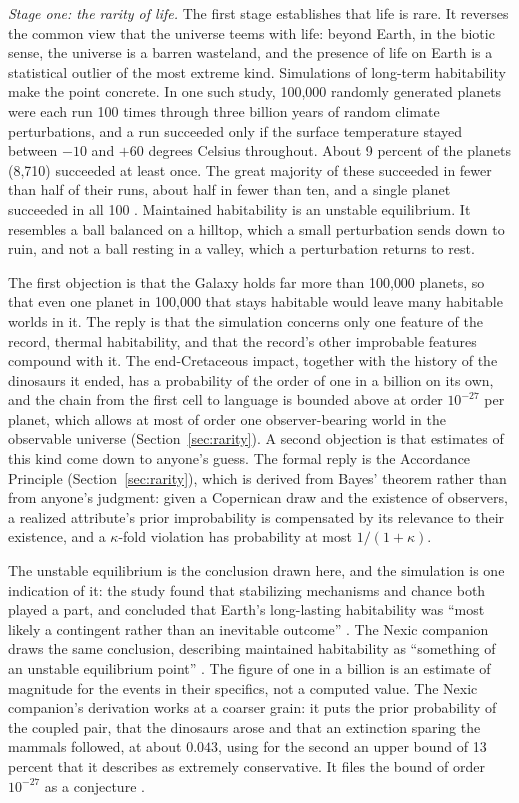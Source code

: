 \emph{Stage one: the rarity of life.} The first stage establishes that life
is rare. It reverses the common view that the universe teems with life:
beyond Earth, in the biotic sense, the universe is a barren wasteland, and
the presence of life on Earth is a statistical outlier of the most extreme
kind. Simulations of long-term habitability make the point concrete. In one
such study, 100{,}000 randomly generated planets were each run 100 times
through three billion years of random climate perturbations, and a run
succeeded only if the surface temperature stayed between $-10$ and $+60$
degrees Celsius throughout. About 9 percent of the planets (8{,}710)
succeeded at least once. The great majority of these succeeded in fewer than
half of their runs, about half in fewer than ten, and a single planet
succeeded in all 100 \cite{Tyrrell2020}. Maintained habitability is an
unstable equilibrium. It resembles a ball balanced on a hilltop, which a
small perturbation sends down to ruin, and not a ball resting in a valley,
which a perturbation returns to rest.

The first objection is that the Galaxy holds far more than 100{,}000
planets, so that even one planet in 100{,}000 that stays habitable would
leave many habitable worlds in it. The reply is that the simulation concerns
only one feature of the record, thermal habitability, and that the record's
other improbable features compound with it. The end-Cretaceous impact,
together with the history of the dinosaurs it ended, has a probability of
the order of one in a billion on its own, and the chain from the first cell
to language is bounded above at order $10^{-27}$ per planet, which allows at
most of order one observer-bearing world in the observable universe
(Section~\ref{sec:rarity}). A second objection is that estimates of this
kind come down to anyone's guess. The formal reply is the Accordance
Principle (Section~\ref{sec:rarity}), which is derived from Bayes' theorem
rather than from anyone's judgment: given a Copernican draw and the
existence of observers, a realized attribute's prior improbability is
compensated by its relevance to their existence, and a $\kappa$-fold
violation has probability at most $1/(1+\kappa)$.

The unstable equilibrium is the conclusion drawn here, and the simulation is
one indication of it: the study found that stabilizing mechanisms and chance
both played a part, and concluded that Earth's long-lasting habitability was
``most likely a contingent rather than an inevitable outcome''
\cite{Tyrrell2020}. The Nexic companion draws the same conclusion,
describing maintained habitability as ``something of an unstable equilibrium
point'' \cite{Nexus}. The figure of one in a billion is an estimate of
magnitude for the events in their specifics, not a computed value. The Nexic
companion's derivation works at a coarser grain: it puts the prior
probability of the coupled pair, that the dinosaurs arose and that an
extinction sparing the mammals followed, at about $0.043$, using for the
second an upper bound of 13 percent that it describes as extremely
conservative. It files the bound of order $10^{-27}$ as a conjecture
\cite{Nexus}.

